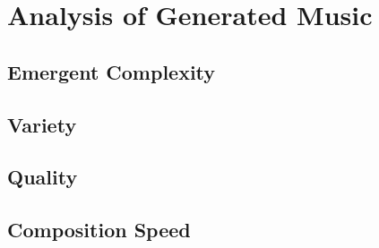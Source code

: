 \section{Analysis of Generated Music}

\subsection{Emergent Complexity} %
\subsection{Variety} %
\subsection{Quality} %
\subsection{Composition Speed} %
